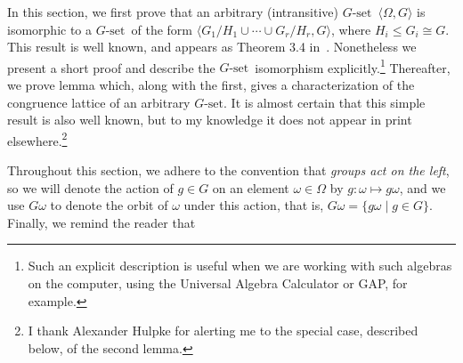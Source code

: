 \documentclass[cm,dissertation,actual,final]{uhthesis}
\theoremstyle{plain}
\theoremstyle{definition}
\theoremstyle{remark}
\numberwithin{theorem}{section}
\numberwithin{claim}{chapter}
\numberwithin{equation}{section}
\numberwithin{conjecture}{chapter}
\newcommand{\<}{\ensuremath{\langle}}
\renewcommand{\>}{\ensuremath{\rangle}}
\renewcommand{\leq}{\ensuremath{\leqslant}}
\newcommand{\GAP}{\textsf{GAP}}
\newcommand{\0}{\ensuremath{\mathbf{0}}}
\newcommand{\1}{\ensuremath{\mathbf{1}}}
\newcommand{\2}{\ensuremath{\mathbf{2}}}
\newcommand{\3}{\ensuremath{\mathbf{3}}}
\newcommand{\4}{\ensuremath{\mathbf{4}}}
\newcommand{\5}{\ensuremath{\mathbf{5}}}
\newcommand{\Gset}{\ensuremath{G\text{-set}}}
\begin{document}
In this section, we first prove 
that an arbitrary (intransitive)
\Gset\ $\<\Omega, G\>$ is isomorphic to a \Gset\ of the form
$\<G_1/H_1 \cup \cdots \cup G_r/H_r, G\>$, where
$H_i \leq G_i\cong G$. 
This result is well known, and appears as
Theorem 3.4 in~\cite{alvi:1987}.  Nonetheless we present a short proof and
describe the \Gset\ isomorphism explicitly.\footnote{Such an explicit
  description is useful when we are working with such algebras on the computer,
  using the Universal Algebra Calculator or \GAP, for example.}
Thereafter, we prove lemma which, along
with the first, gives a characterization of the congruence lattice of an
arbitrary \Gset.   
It is almost certain that this simple result is also well known,
but to my knowledge it does not appear in print elsewhere.\footnote{I thank Alexander
Hulpke for alerting me to the special case, described below, of the second lemma.}

Throughout this section, we adhere to the convention that \emph{groups act on the
  left}, so we will denote the action of $g\in G$ on an element 
$\omega\in \Omega$ 
by $g: \omega \mapsto g \omega$, and we use $G\omega$ to denote the orbit of
$\omega$ under this action, that is, $G\omega  = \{g\omega  \mid g\in G\}$.
Finally, we remind the reader that
\end{document}
